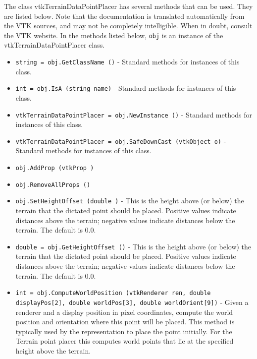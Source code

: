 The class vtkTerrainDataPointPlacer has several methods that can be used.
  They are listed below.
Note that the documentation is translated automatically from the VTK sources,
and may not be completely intelligible.  When in doubt, consult the VTK website.
In the methods listed below, \verb|obj| is an instance of the vtkTerrainDataPointPlacer class.
\begin{itemize}
\item  \verb|string = obj.GetClassName ()| -  Standard methods for instances of this class.

\item  \verb|int = obj.IsA (string name)| -  Standard methods for instances of this class.

\item  \verb|vtkTerrainDataPointPlacer = obj.NewInstance ()| -  Standard methods for instances of this class.

\item  \verb|vtkTerrainDataPointPlacer = obj.SafeDownCast (vtkObject o)| -  Standard methods for instances of this class.

\item  \verb|obj.AddProp (vtkProp )|

\item  \verb|obj.RemoveAllProps ()|

\item  \verb|obj.SetHeightOffset (double )| -  This is the height above (or below) the terrain that the dictated
 point should be placed. Positive values indicate distances above the 
 terrain; negative values indicate distances below the terrain. The 
 default is 0.0. 

\item  \verb|double = obj.GetHeightOffset ()| -  This is the height above (or below) the terrain that the dictated
 point should be placed. Positive values indicate distances above the 
 terrain; negative values indicate distances below the terrain. The 
 default is 0.0. 

\item  \verb|int = obj.ComputeWorldPosition (vtkRenderer ren, double displayPos[2], double worldPos[3], double worldOrient[9])| -  Given a renderer and a display position in pixel coordinates,
 compute the world position and orientation where this point
 will be placed. This method is typically used by the
 representation to place the point initially.
 For the Terrain point placer this computes world points that
 lie at the specified height above the terrain.


\end{itemize}
